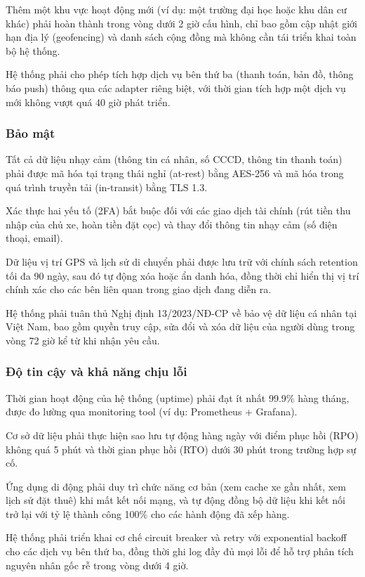 Thêm một khu vực hoạt động mới (ví dụ: một trường đại học hoặc khu dân cư khác) phải hoàn thành trong vòng dưới 2 giờ cấu hình, chỉ bao gồm cập nhật giới hạn địa lý (geofencing) và danh sách cộng đồng mà không cần tái triển khai toàn bộ hệ thống.

Hệ thống phải cho phép tích hợp dịch vụ bên thứ ba (thanh toán, bản đồ, thông báo push) thông qua các adapter riêng biệt, với thời gian tích hợp một dịch vụ mới không vượt quá 40 giờ phát triển.

\subsubsection*{Bảo mật}
Tất cả dữ liệu nhạy cảm (thông tin cá nhân, số CCCD, thông tin thanh toán) phải được mã hóa tại trạng thái nghỉ (at-rest) bằng AES-256 và mã hóa trong quá trình truyền tải (in-transit) bằng TLS 1.3.

Xác thực hai yếu tố (2FA) bắt buộc đối với các giao dịch tài chính (rút tiền thu nhập của chủ xe, hoàn tiền đặt cọc) và thay đổi thông tin nhạy cảm (số điện thoại, email).

Dữ liệu vị trí GPS và lịch sử di chuyển phải được lưu trữ với chính sách retention tối đa 90 ngày, sau đó tự động xóa hoặc ẩn danh hóa, đồng thời chỉ hiển thị vị trí chính xác cho các bên liên quan trong giao dịch đang diễn ra.

Hệ thống phải tuân thủ Nghị định 13/2023/NĐ-CP về bảo vệ dữ liệu cá nhân tại Việt Nam, bao gồm quyền truy cập, sửa đổi và xóa dữ liệu của người dùng trong vòng 72 giờ kể từ khi nhận yêu cầu.

\subsubsection*{Độ tin cậy và khả năng chịu lỗi}
Thời gian hoạt động của hệ thống (uptime) phải đạt ít nhất 99.9\% hàng tháng, được đo lường qua monitoring tool (ví dụ: Prometheus + Grafana).

Cơ sở dữ liệu phải thực hiện sao lưu tự động hàng ngày với điểm phục hồi (RPO) không quá 5 phút và thời gian phục hồi (RTO) dưới 30 phút trong trường hợp sự cố.

Ứng dụng di động phải duy trì chức năng cơ bản (xem cache xe gần nhất, xem lịch sử đặt thuê) khi mất kết nối mạng, và tự động đồng bộ dữ liệu khi kết nối trở lại với tỷ lệ thành công 100\% cho các hành động đã xếp hàng.

Hệ thống phải triển khai cơ chế circuit breaker và retry với exponential backoff cho các dịch vụ bên thứ ba, đồng thời ghi log đầy đủ mọi lỗi để hỗ trợ phân tích nguyên nhân gốc rễ trong vòng dưới 4 giờ.

